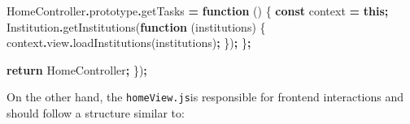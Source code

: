 \documentclass[
  11pt,
]{krantz}
\newenvironment{Shaded}{\begin{snugshade}}{\end{snugshade}}
\newcommand{\AttributeTok}[1]{\textcolor[rgb]{0.61,0.61,0.61}{#1}}
\newcommand{\ControlFlowTok}[1]{\textcolor[rgb]{0.27,0.27,0.27}{\textbf{#1}}}
\newcommand{\FunctionTok}[1]{\textcolor[rgb]{0,0,0}{#1}}
\newcommand{\KeywordTok}[1]{\textcolor[rgb]{0.27,0.27,0.27}{\textbf{#1}}}
\newcommand{\NormalTok}[1]{#1}
\newcommand{\OperatorTok}[1]{\textcolor[rgb]{0.43,0.43,0.43}{\textbf{#1}}}
\begin{document}
\begin{Shaded}
\begin{Highlighting}[]
\NormalTok{    HomeController}\OperatorTok{.}\AttributeTok{prototype}\OperatorTok{.}\AttributeTok{getTasks} \OperatorTok{=} \KeywordTok{function}\NormalTok{ () \{}
        \KeywordTok{const}\NormalTok{ context }\OperatorTok{=} \KeywordTok{this}\OperatorTok{;}
\NormalTok{    Institution}\OperatorTok{.}\FunctionTok{getInstitutions}\NormalTok{(}\KeywordTok{function}\NormalTok{ (institutions) \{}
\NormalTok{        context}\OperatorTok{.}\AttributeTok{view}\OperatorTok{.}\FunctionTok{loadInstitutions}\NormalTok{(institutions)}\OperatorTok{;}
\NormalTok{    \})}\OperatorTok{;}
\NormalTok{    \}}\OperatorTok{;}

    \ControlFlowTok{return}\NormalTok{ HomeController}\OperatorTok{;}
\NormalTok{\})}\OperatorTok{;}
\end{Highlighting}
\end{Shaded}

On the other hand, the \texttt{homeView.js}is responsible for frontend interactions and should follow a structure similar to:
\end{document}
